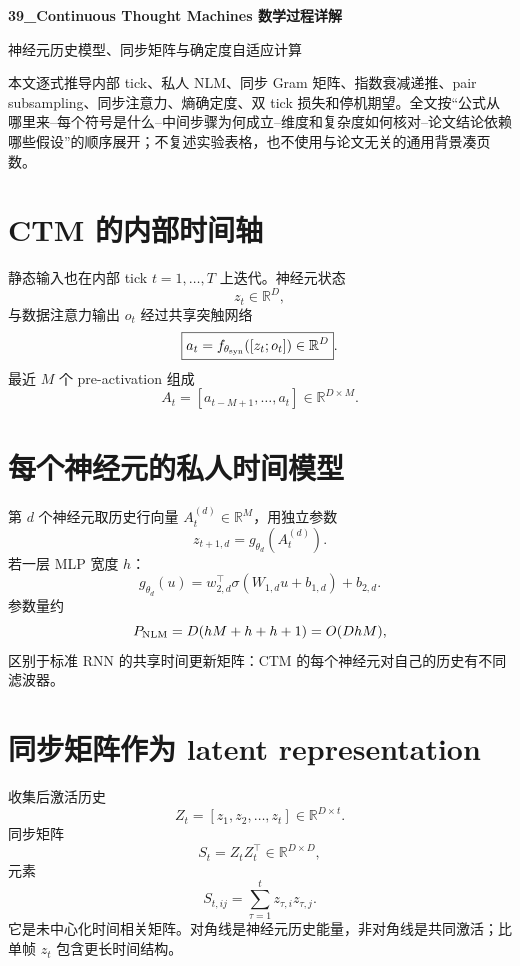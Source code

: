 \documentclass[UTF8,12pt,a4paper,fontset=none]{ctexart}
\numberwithin{equation}{section}
\newcommand{\R}{\mathbb{R}}
\begin{document}
\begin{center}
{\LARGE\bfseries 39\_Continuous Thought Machines 数学过程详解}\par
\vspace{0.35em}
{\large 神经元历史模型、同步矩阵与确定度自适应计算}
\end{center}
\vspace{0.45em}
\begin{keybox}[本文只处理真正需要推导的部分]
本文逐式推导内部 tick、私人 NLM、同步 Gram 矩阵、指数衰减递推、pair subsampling、同步注意力、熵确定度、双 tick 损失和停机期望。全文按“公式从哪里来--每个符号是什么--中间步骤为何成立--维度和复杂度如何核对--论文结论依赖哪些假设”的顺序展开；不复述实验表格，也不使用与论文无关的通用背景凑页数。
\end{keybox}
\tableofcontents
\newpage

\section{CTM 的内部时间轴}
静态输入也在内部 tick $t=1,\ldots,T$ 上迭代。神经元状态
\begin{equation}
 z_t\in\R^D,
\end{equation}
与数据注意力输出 $o_t$ 经过共享突触网络
\begin{equation}
 \boxed{a_t=f_{\theta_{\rm syn}}([z_t;o_t])\in\R^D}.
\end{equation}
最近 $M$ 个 pre-activation 组成
\begin{equation}
 A_t=[a_{t-M+1},\ldots,a_t]\in\R^{D\times M}.
\end{equation}

\section{每个神经元的私人时间模型}
第 $d$ 个神经元取历史行向量 $A_t^{(d)}\in\R^M$，用独立参数
\begin{equation}
 z_{t+1,d}=g_{\theta_d}(A_t^{(d)}).
\end{equation}
若一层 MLP 宽度 $h$：
\begin{equation}
 g_{\theta_d}(u)=w_{2,d}^\top\sigma(W_{1,d}u+b_{1,d})+b_{2,d}.
\end{equation}
参数量约
\begin{equation}
 P_{\rm NLM}=D(hM+h+h+1)=O(DhM),
\end{equation}
区别于标准 RNN 的共享时间更新矩阵：CTM 的每个神经元对自己的历史有不同滤波器。

\section{同步矩阵作为 latent representation}
收集后激活历史
\begin{equation}
 Z_t=[z_1,z_2,\ldots,z_t]\in\R^{D\times t}.
\end{equation}
同步矩阵
\begin{equation}
 \boxed{S_t=Z_tZ_t^\top\in\R^{D\times D}},
\end{equation}
元素
\begin{equation}
 S_{t,ij}=\sum_{\tau=1}^{t}z_{\tau,i}z_{\tau,j}.
\end{equation}
它是未中心化时间相关矩阵。对角线是神经元历史能量，非对角线是共同激活；比单帧 $z_t$ 包含更长时间结构。
\end{document}
